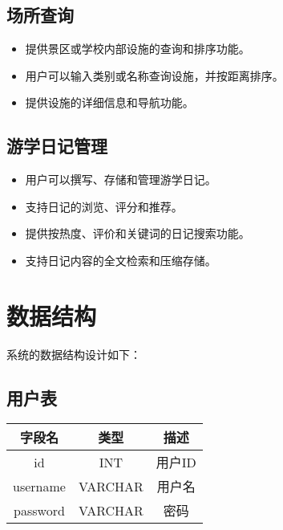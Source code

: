 \documentclass{ctexart}
\begin{document}
\subsection{场所查询}
\begin{itemize}
    \item 提供景区或学校内部设施的查询和排序功能。
    \item 用户可以输入类别或名称查询设施，并按距离排序。
    \item 提供设施的详细信息和导航功能。
\end{itemize}

\subsection{游学日记管理}
\begin{itemize}
    \item 用户可以撰写、存储和管理游学日记。
    \item 支持日记的浏览、评分和推荐。
    \item 提供按热度、评价和关键词的日记搜索功能。
    \item 支持日记内容的全文检索和压缩存储。
\end{itemize}

\section{数据结构}
系统的数据结构设计如下：

\subsection{用户表}
\begin{center}
    \begin{tabular}{ccc}
        \toprule
        字段名      & 类型      & 描述   \\
        \midrule
        id       & INT     & 用户ID \\
        username & VARCHAR & 用户名  \\
        password & VARCHAR & 密码   \\
        \bottomrule
    \end{tabular}
\end{center}
\end{document}
